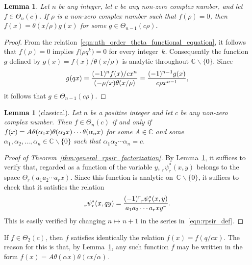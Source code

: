 \documentclass[10pt,a4paper]{amsart}
\numberwithin{equation}{section}
\newtheorem{Lemma}[Theorem]{Lemma}
\newcommand{\C}{\mathbb{C}}
\renewcommand{\sp}{\hspace{0.5pt}}
\begin{document}
\begin{Lemma} \label{lem:theta_root}
Let $n$ be any integer, let $c$ be any non-zero complex number, and let $f \in \Theta_n(c)$. If $\rho$ is a non-zero complex number such that $f(\rho)=0$, then $f(x) = \theta(x/\rho)g(x)$ for some $g \in \Theta_{n-1}(c\rho)$.
\end{Lemma}

\begin{proof}
From the relation~\eqref{eqn:nth_order_theta_functional_equation}, it follows that $f(\rho)=0$ implies $f\bigl(\rho q^k\bigr)=0$ for every integer~$k$. Consequently the function $g$ defined by $g(x) = f(x)/\theta(x/\rho)$ is analytic throughout $\C \backslash \{0\}$. Since
\[ g(qx) = {(-1)^n f(x) / cx^n \over (-\rho/x) \theta(x/\rho)} = {(-1)^{n-1} g(x) \over c\rho x^{n-1}}, \]
it follows that $g \in \Theta_{n-1}(c\rho)$.
\end{proof}

\begin{Lemma}[classical] \label{lem:theta_factorization}
Let $n$ be a positive integer and let $c$ be any non-zero complex number. Then $f \in \Theta_n(c)$ if and only if
$f(x) = A \sp \theta(\alpha_1x) \theta(\alpha_2x) \cdots \theta(\alpha_nx)$
for some $A \in \C$ and some~${\alpha_1, \alpha_2,\dots,\alpha_n \in \C\backslash\{0\}}$ such that $\alpha_1\alpha_2 \cdots \alpha_n = c$.
\end{Lemma}

\begin{proof}[Proof of Theorem~\ref{thm:general_rpsir_factorization}]
By Lemma~\ref{lem:theta_factorization}, it suffices to verify that, regarded as a function of the variable $y$, $_r^{}\psi_r^\ast(x,y)$ belongs to the space $\Theta_r(a_1a_2\cdots a_r x)$. Since this function is analytic on~${\C \backslash\{0\}}$, it suffices to check that it satisfies the relation
\[ _r^{}\psi_r^\ast(x,qy) = {(-1)^r {}_r^{}\psi_r^\ast(x,y) \over a_1a_2\cdots a_r x y^r}. \]
This is easily verified by changing $n \mapsto n+1$ in the series in~\eqref{eqn:rpsir_def}.
\end{proof}

\begin{Remark} \label{rmk:Theta2_relation}
If $f \in \Theta_2(c)$, then $f$ satisfies identically the relation $f(x) = f(q/cx)$. The reason for this is that, by Lemma~\ref{lem:theta_factorization}, any such function $f$ may be written in the form $f(x) = A\theta(\alpha x) \theta(cx/\alpha)$.
\end{Remark}
\end{document}
